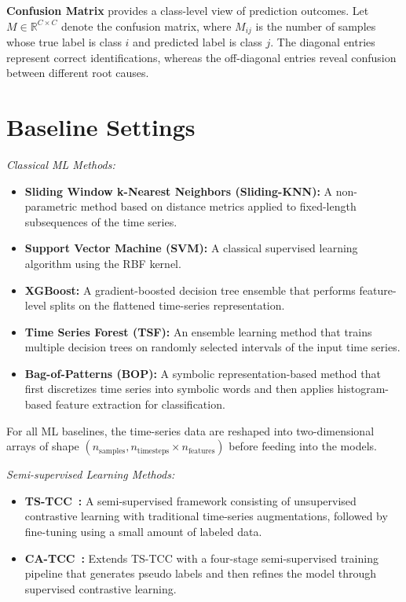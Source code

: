 \documentclass[lettersize,journal]{IEEEtran}
\begin{document}
{{\noindent\textbf{Confusion Matrix} provides a class-level view of prediction outcomes. Let $M \in \mathbb{R}^{C \times C}$ denote the confusion matrix, where $M_{ij}$ is the number of samples whose true label is class $i$ and predicted label is class $j$. The diagonal entries represent correct identifications, whereas the off-diagonal entries reveal confusion between different root causes.


\section{Baseline Settings}
\label{appendix:baselines}

\noindent\textit{Classical ML Methods:}
\begin{itemize}
    \item \textbf{Sliding Window k-Nearest Neighbors (Sliding-KNN):} A non-parametric method based on distance metrics applied to fixed-length subsequences of the time series.
    \item \textbf{Support Vector Machine (SVM):} A classical supervised learning algorithm using the RBF kernel.
    \item \textbf{XGBoost:} A gradient-boosted decision tree ensemble that performs feature-level splits on the flattened time-series representation.
    \item \textbf{Time Series Forest (TSF):} An ensemble learning method that trains multiple decision trees on randomly selected intervals of the input time series.
    \item \textbf{Bag-of-Patterns (BOP):} A symbolic representation-based method that first discretizes time series into symbolic words and then applies histogram-based feature extraction for classification.
\end{itemize}
For all ML baselines, the time-series data are reshaped into two-dimensional arrays of shape $(n_\text{samples}, n_\text{timesteps} \times n_\text{features})$ before feeding into the models.

\noindent\textit{Semi-supervised Learning Methods:}
\begin{itemize}
    \item \textbf{TS-TCC~\cite{eldele2021time}:} A semi-supervised framework consisting of unsupervised contrastive learning with traditional time-series augmentations, followed by fine-tuning using a small amount of labeled data.
    \item \textbf{CA-TCC~\cite{eldele2023self}:} Extends TS-TCC with a four-stage semi-supervised training pipeline that generates pseudo labels and then refines the model through supervised contrastive learning.
\end{itemize}


}}
\end{document}
